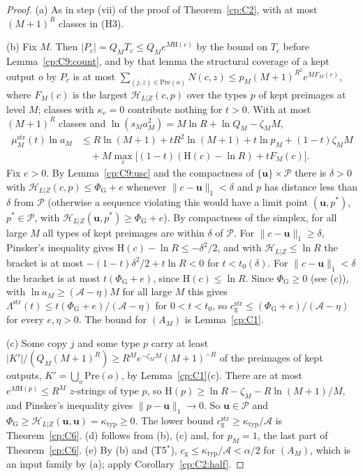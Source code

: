 \documentclass[11pt]{article}
\theoremstyle{definition}
\theoremstyle{remark}
\newcommand{\abs}[1]{\lvert #1\rvert}
\newcommand{\Ent}{\mathrm{H}}                 %
\newcommand{\Lam}{\Lambda}                    %
\newcommand{\cg}{c_{\mathrm g}}               %
\newcommand{\Hcond}[1]{\textup{(H#1)}}        %
\newcommand{\Tcond}[1]{\textup{(T#1)}}        %
\newcommand{\Acs}{\mathcal A}                %
\newcommand{\ktyp}{\kappa_{\mathrm{typ}}}    %
\newcommand{\Hlz}{\mathcal H_{L|Z}}          %
\newcommand{\unif}{\mathbf u}                %
\newcommand{\Pre}{\mathrm{Pre}}              %
\newcommand{\PhiG}{\Phi_{\mathrm G}}         %
\newcommand{\norm}[1]{\lVert#1\rVert}
\begin{document}
\begin{proof}
(a) As in step (vii) of the proof of Theorem~\ref{cp:C2}, with at most $(M+1)^R$ classes in \Hcond3.

(b) Fix $M$. Then $\abs{P_c}=Q_MT_c\le Q_Me^{M\Ent(c)}$ by the bound on $T_c$ before Lemma~\ref{cp:C9:count}, and by that lemma the structural coverage of a kept output $o$ by $P_c$ is at most $\sum_{(j,z)\in\Pre(o)}N(c,z)\le p_M(M+1)^{R^2}e^{MF_M(c)}$, where $F_M(c)$ is the largest $\Hlz(c,p)$ over the types $p$ of kept preimages at level $M$; classes with $\kappa_c=0$ contribute nothing for $t>0$. With at most $(M+1)^R$ classes and $\ln(s_Ma_M^2)=M\ln R+\ln Q_M-\zeta_MM$,
\begin{align*}
\mu^{\mathrm{str}}_M(t)\ln a_M&\le R\ln(M+1)+tR^2\ln(M+1)+t\ln p_M+(1-t)\zeta_MM\\
&\quad+M\max_c\bigl[(1-t)(\Ent(c)-\ln R)+tF_M(c)\bigr].
\end{align*}
Fix $e>0$. By Lemma~\ref{cp:C9:usc} and the compactness of $\{\unif\}\times\mathcal P$ there is $\delta>0$ with $\Hlz(c,p)\le\PhiG+e$ whenever $\norm{c-\unif}_1<\delta$ and $p$ has distance less than $\delta$ from $\mathcal P$ (otherwise a sequence violating this would have a limit point $(\unif,p^*)$, $p^*\in\mathcal P$, with $\Hlz(\unif,p^*)\ge\PhiG+e$). By compactness of the simplex, for all large $M$ all types of kept preimages are within $\delta$ of $\mathcal P$. For $\norm{c-\unif}_1\ge\delta$, Pinsker's inequality gives $\Ent(c)-\ln R\le-\delta^2/2$, and with $\Hlz\le\ln R$ the bracket is at most $-(1-t)\delta^2/2+t\ln R<0$ for $t<t_0(\delta)$. For $\norm{c-\unif}_1<\delta$ the bracket is at most $t(\PhiG+e)$, since $\Ent(c)\le\ln R$. Since $\PhiG\ge0$ (see (c)), with $\ln a_M\ge(\Acs-\eta)M$ for all large $M$ this gives $\Lam^{\mathrm{str}}(t)\le t(\PhiG+e)/(\Acs-\eta)$ for $0<t<t_0$, so $\cg^{\mathrm{str}}\le(\PhiG+e)/(\Acs-\eta)$ for every $e,\eta>0$. The bound for $(A_M)$ is Lemma~\ref{cp:C1}.

(c) Some copy $j$ and some type $p$ carry at least $\abs{K'}/(Q_M(M+1)^R)\ge R^Me^{-\zeta_MM}(M+1)^{-R}$ of the preimages of kept outputs, $K'=\bigcup_o\Pre(o)$, by Lemma~\ref{cp:C1}(c). There are at most $e^{M\Ent(p)}\le R^M$ $z$-strings of type $p$, so $\Ent(p)\ge\ln R-\zeta_M-R\ln(M+1)/M$, and Pinsker's inequality gives $\norm{p-\unif}_1\to0$. So $\unif\in\mathcal P$ and $\PhiG\ge\Hlz(\unif,\unif)=\ktyp\ge0$. The lower bound $\cg^{\mathrm{str}}\ge\ktyp/\Acs$ is Theorem~\ref{cp:C6}. (d) follows from (b), (c) and, for $p_M=1$, the last part of Theorem~\ref{cp:C6}. (e) By (b) and \Tcond{5$^*$}, $\cg\le\ktyp/\Acs<\alpha/2$ for $(A_M)$, which is an input family by (a); apply Corollary~\ref{cp:C2:half}.
\end{proof}
\end{document}
